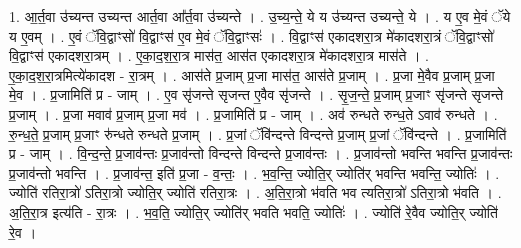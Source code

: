 \documentclass[17pt]{extarticle}
\begin{document}
1. आ॒र्त॒वा उ॑च्यन्त उच्यन्त आर्त॒वा आ᳚र्त॒वा उ॑च्यन्ते । . उ॒च्य॒न्ते॒ ये य उ॑च्यन्त उच्यन्ते॒ ये । . य ए॒व मे॒वं ॅये य ए॒वम् । . ए॒वं ॅवि॒द्वाꣳसो॑ वि॒द्वाꣳस॑ ए॒व मे॒वं ॅवि॒द्वाꣳसः॑ । . वि॒द्वाꣳस॑ एकादशरा॒त्र मे॑कादशरा॒त्रं ॅवि॒द्वाꣳसो॑ वि॒द्वाꣳस॑ एकादशरा॒त्रम् । . ए॒का॒द॒श॒रा॒त्र मास॑त॒ आस॑त एकादशरा॒त्र मे॑कादशरा॒त्र मास॑ते । . ए॒का॒द॒श॒रा॒त्रमित्ये॑कादश - रा॒त्रम् । . आस॑ते प्र॒जाम् प्र॒जा मास॑त॒ आस॑ते प्र॒जाम् । . प्र॒जा मे॒वैव प्र॒जाम् प्र॒जा मे॒व । . प्र॒जामिति॑ प्र - जाम् । . ए॒व सृ॑जन्ते सृजन्त ए॒वैव सृ॑जन्ते । . सृ॒ज॒न्ते॒ प्र॒जाम् प्र॒जाꣳ सृ॑जन्ते सृजन्ते प्र॒जाम् । . प्र॒जा मवाव॑ प्र॒जाम् प्र॒जा मव॑ । . प्र॒जामिति॑ प्र - जाम् । . अव॑ रुन्धते रुन्ध॒ते ऽवाव॑ रुन्धते । . रु॒न्ध॒ते॒ प्र॒जाम् प्र॒जाꣳ रु॑न्धते रुन्धते प्र॒जाम् । . प्र॒जां ॅवि॑न्दन्ते विन्दन्ते प्र॒जाम् प्र॒जां ॅवि॑न्दन्ते । . प्र॒जामिति॑ प्र - जाम् । . वि॒न्द॒न्ते॒ प्र॒जाव॑न्तः प्र॒जाव॑न्तो विन्दन्ते विन्दन्ते प्र॒जाव॑न्तः । . प्र॒जाव॑न्तो भवन्ति भवन्ति प्र॒जाव॑न्तः प्र॒जाव॑न्तो भवन्ति । . प्र॒जाव॑न्त॒ इति॑ प्र॒जा - व॒न्तः॒ । . भ॒व॒न्ति॒ ज्योति॒र् ज्योति॑र् भवन्ति भवन्ति॒ ज्योतिः॑ । . ज्योति॑ रतिरा॒त्रो॑ ऽतिरा॒त्रो ज्योति॒र् ज्योति॑ रतिरा॒त्रः । . अ॒ति॒रा॒त्रो भ॑वति भव त्यतिरा॒त्रो॑ ऽतिरा॒त्रो भ॑वति । . अ॒ति॒रा॒त्र इत्य॑ति - रा॒त्रः । . भ॒व॒ति॒ ज्योति॒र् ज्योति॑र् भवति भवति॒ ज्योतिः॑ । . ज्योति॑ रे॒वैव ज्योति॒र् ज्योति॑ रे॒व । \newline
\end{document}
